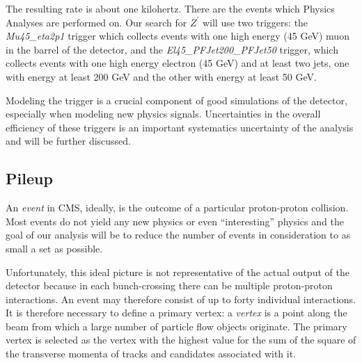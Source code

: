The resulting rate is about one kilohertz. There are the events which Physics Analyses are performed on. Our search for $Z^\prime$ will use two triggers: the \textit{Mu45\_eta2p1} trigger which collects events with one high energy (45 GeV) muon in the barrel of the detector, and the \textit{El45\_PFJet200\_PFJet50} trigger, which collects events with one high energy electron (45 GeV) and at least two jets, one with energy at least 200 GeV and the other with energy at least 50 GeV.

Modeling the trigger is a crucial component of good simulations of the detector, especially when modeling new physics signals. Uncertainties in the overall efficiency of these triggers is an important systematics uncertainty of the analysis and will be further discussed.

\subsection{Pileup}
An \textit{event} in CMS, ideally, is the outcome of a particular proton-proton collision. Most events do not yield any new physics or even ``interesting'' physics and the goal of our analysis will be to reduce the number of events in consideration to as small a set as possible.

Unfortunately, this ideal picture is not representative of the actual output of the detector because in each bunch-crossing there can be multiple proton-proton interactions. An event may therefore consist of up to forty individual interactions. It is therefore necessary to define a primary vertex: a \textit{vertex} is a point along the beam from which a large number of particle flow objects originate. The primary vertex is selected as the vertex with the highest value for the sum of the square of the transverse momenta of tracks and candidates associated with it.

